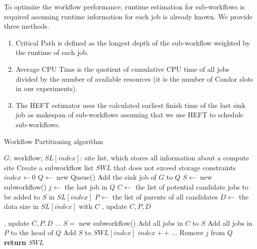 To optimize the workflow performance, runtime estimation for sub-workflows is required assuming runtime information for each job is already known. We provide three methods. 
\begin{enumerate}
\item Critical Path is defined as the longest depth of the sub-workflow weighted by the runtime of each job. 
\item Average CPU Time is the quotient of cumulative CPU time of all jobs divided by the number of available resources (it is the number of Condor slots in our experiments). 
\item The HEFT estimator uses the calculated earliest finish time of the last sink job as makespan of sub-workflows assuming that we use HEFT to schedule sub-workflows. 
\end{enumerate}

\begin{algorithm}[h!]
\caption{Workflow Partitioning algorithm}
\label{alg:parworkflow}
\begin{algorithmic}[1]
\Require $G$: workflow; $SL[index]$: site list, which stores all information about a compute site
\Ensure Create a subworkflow list $SWL$ that does not exceed storage constraints
   \State $index\gets 0$
   \State $Q\gets$ new Queue()
   \State Add the sink job of $G$ to $Q$
   \State $S\gets$ new subworkflow()
      \State $j\gets$ the last job in $Q$
      \State {} 
      \State $C\gets$ the list of potential candidate jobs to be added to $S$ in $SL[index]$
      \State $P\gets$ the list of parents of all candidates
      \State $D\gets$ the data size in $SL[index]$ with $C$
         \State {}, update $C,P,D$
      
         \State {}, update $C,P,D$
      \EndIf
      \EndIf
	\State ...
         \State$S=$ new subworkflow()
      \EndIf
     \State Add all jobs in $C$ to $S$
     \State Add all jobs in $P$ to the head of $Q$
     \State Add $S$ to $SWL[index]$
         \State $index++$
      \EndIf
   \State ... 
   \State Remove $j$ from $Q$
   \EndWhile
   \State \textbf{return }$SWL$

\EndProcedure
\end{algorithmic}
\end{algorithm}


